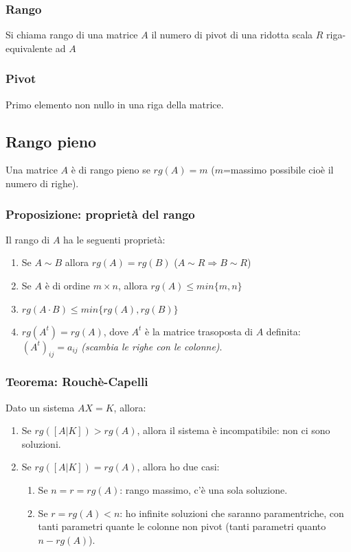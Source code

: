 \subsubsection{Rango}
Si chiama rango di una matrice \(A\) il numero di pivot di una ridotta scala \(R\) riga-equivalente ad \(A\)

\subsubsection{Pivot}
Primo elemento non nullo in una riga della matrice.

\subsection{Rango pieno}
Una matrice \(A\) è di rango pieno se \(rg(A)=m\) (\(m\)=massimo possibile cioè il numero di righe).

\subsubsection{Proposizione: proprietà del rango}
Il rango di \(A\) ha le seguenti proprietà:

\begin{enumerate}
	\item Se \(A\sim B\) allora \(rg(A)=rg(B)\) (\(A\sim R\Rightarrow B\sim R\))
	\item Se \(A\) è di ordine \(m\times n\), allora \(rg(A)\leq min\{m,n\}\)
	\item \(rg(A\cdot B)\leq min\{rg(A),rg(B)\}\)
	\item \(rg(A^t)=rg(A)\), dove \(A^t\) è la matrice trasoposta di \(A\) definita: \((A^t)_{ij}=a_{ij}\) \textit{(scambia le righe con le colonne)}.
\end{enumerate} 

\subsubsection{Teorema: Rouchè-Capelli}
Dato un sistema \(AX=K\), allora:
\begin{enumerate}
	\item Se \(rg([A|K])>rg(A)\), allora il sistema è incompatibile: non ci sono soluzioni.
	\item Se \(rg([A|K])=rg(A)\), allora ho due casi:

	\begin{enumerate}
		\item Se \(n=r=rg(A)\): rango massimo, c'è una sola soluzione.
		\item Se \(r=rg(A)<n\): ho infinite soluzioni che saranno paramentriche, con tanti parametri quante le colonne non pivot (tanti parametri quanto \(n-rg(A)\)).
	\end{enumerate}	
	
\end{enumerate}